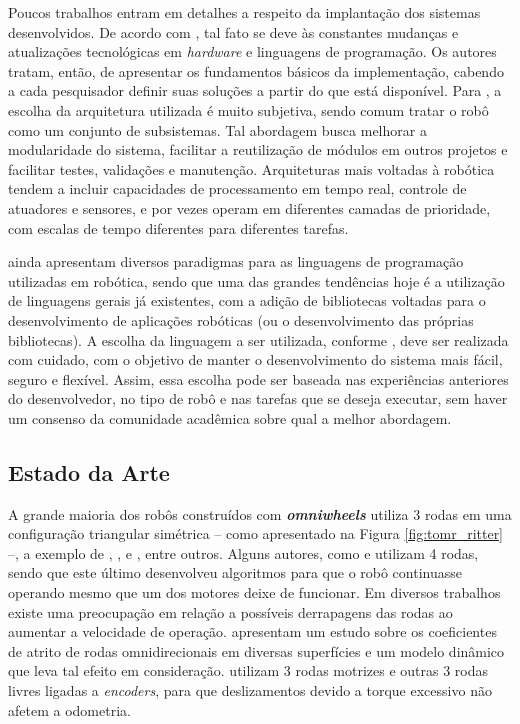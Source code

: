 

Poucos trabalhos entram em detalhes a respeito da implantação dos sistemas desenvolvidos. De acordo com \cite{craig2017introduction}, tal fato se deve às constantes mudanças e atualizações tecnológicas em \textit{hardware} e linguagens de programação. Os autores tratam, então, de apresentar os fundamentos básicos da implementação, cabendo a cada pesquisador definir suas soluções a partir do que está disponível. Para \cite{siciliano2016springer}, a escolha da arquitetura utilizada é muito subjetiva, sendo comum tratar o robô como um conjunto de subsistemas. Tal abordagem busca melhorar a modularidade do sistema, facilitar a reutilização de módulos em outros projetos e facilitar testes, validações e manutenção. Arquiteturas mais voltadas à robótica tendem a incluir capacidades de processamento em  tempo real, controle de atuadores e sensores, e por vezes operam em diferentes camadas de prioridade, com escalas de tempo diferentes para diferentes tarefas.

\cite{craig2017introduction} ainda apresentam diversos paradigmas para as linguagens de programação utilizadas em robótica, sendo que uma das grandes tendências hoje é a utilização de linguagens gerais já existentes, com a adição de bibliotecas voltadas para o desenvolvimento de aplicações robóticas (ou o desenvolvimento das próprias bibliotecas). A escolha da linguagem a ser utilizada, conforme \cite{siciliano2016springer}, deve ser realizada com cuidado, com o objetivo de manter o desenvolvimento do sistema mais fácil, seguro e flexível. Assim, essa escolha pode ser baseada nas experiências anteriores do desenvolvedor, no tipo de robô e nas tarefas que se deseja executar, sem haver um consenso da comunidade acadêmica sobre qual a melhor abordagem.

\subsection{Estado da Arte}


A grande maioria dos robôs construídos com \textbf{\emph{omniwheels}} utiliza 3 rodas em uma configuração triangular simétrica -- como apresentado na Figura \ref{fig:tomr_ritter} --, a exemplo de \cite{ritter2016modelagem}, \cite{samani2007comprehensive}, \cite{williams2002dynamic} e \cite{indiveri2009swedish}, entre outros. Alguns autores, como \cite{krinkin2015design} e \cite{rojas2006holonomic} utilizam 4 rodas, sendo que este último desenvolveu algoritmos para que o robô continuasse operando mesmo que um dos motores deixe de funcionar. Em diversos trabalhos existe uma preocupação em relação a possíveis derrapagens das rodas ao aumentar a velocidade de operação. \cite{williams2002dynamic} apresentam um estudo sobre os coeficientes de atrito de rodas omnidirecionais em diversas superfícies e um modelo dinâmico que leva tal efeito em consideração. \cite{samani2007comprehensive} utilizam 3 rodas motrizes e outras 3 rodas livres ligadas a \textit{encoders}, para que deslizamentos devido a torque excessivo não afetem a odometria.

